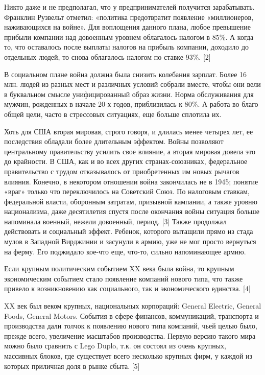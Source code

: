 \documentclass[ebook,12pt,oneside,openany]{memoir}
\begin{document}
Никто даже и не предполагал, что у предпринимателей получится
зарабатывать. Франклин Рузвельт отметил: «политика предотвратит
появление «миллионеров, наживающихся на войне». Для воплощения данного
плана, любое превышение прибыли компании над довоенным уровнем
облагалось налогом в 85\%. А когда то, что оставалось после выплаты
налогов на прибыль компании, доходило до отдельных людей, то снова
облагалось налогом по ставке 93\%. [2] \newline

В социальном плане война должна была снизить колебания зарплат. Более
16 млн. людей из разных мест и различных условий собрали вместе, чтобы
они вели в буквальном смысле унифицированный образ жизни. Норма
обслуживания для мужчин, рожденных в начале 20-х годов, приблизилась к
80\%. А работа во благо общей цели, часто в стрессовых ситуациях, еще
больше сплотила их. \newline

Хоть для США вторая мировая, строго говоря, и длилась менее четырех
лет, ее последствия обладали более длительным эффектом. Войны
позволяют центральному правительству усилить свое влияние, а вторая
мировая довела это до крайности. В США, как и во всех других
странах-союзниках, федеральное правительство с трудом отказывалось от
приобретенных им новых рычагов влияния. Конечно, в некотором отношении
война закончилась не в 1945; понятие «враг» только что переключилось
на Советский Союз. По налоговым ставкам, федеральной власти, оборонным
затратам, призывной кампании, а также уровню национализма, даже
десятилетия спустя после окончания войны ситуация больше напоминала
военный, нежели довоенный, период. [3] Также продолжал действовать и
социальный эффект. Ребенок, которого вытащили прямо из стада мулов в
Западной Вирджинии и засунули в армию, уже не мог просто вернуться на
ферму. Его поджидало кое-что еще, что-то, сильно напоминающее армию. \newline

Если крупным политическим событием XX века была война, то крупным
экономическим событием стало появление компаний нового типа, что также
привело к возникновению как социального, так и экономического
единства. [4] \newline

XX век был веком крупных, национальных корпораций: General Electric,
General Foods, General Motors. События в сфере финансов, коммуникаций,
транспорта и производства дали толчок к появлению нового типа
компаний, чьей целью было, прежде всего, увеличение масштабов
производства. Первую версию такого мира можно было сравнить с Lego
Duplo, т.к. он состоял из очень крупных, массивных блоков, где
существует всего несколько крупных фирм, у каждой из которых приличная
доля в рынке сбыта. [5] \newline
\end{document}
